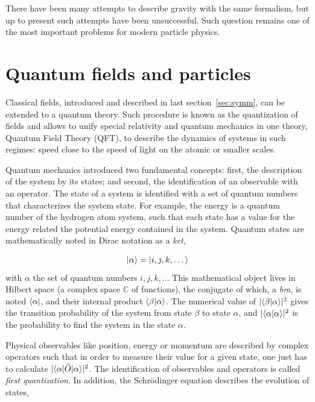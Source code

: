 There have been many attempts to describe gravity with the same formalism, but up to present such attempts have been unsuccessful. Such question remains one of the most important problems for modern particle physics.  

\section{Quantum fields and particles}
\label{sec:fields}

Classical fields, introduced and described in last section~\ref{sec:symm}, can be extended to a quantum theory. Such procedure is known as the quantization of fields and allows to unify special relativity and quantum mechanics in one theory, Quantum Field Theory (QFT), to describe the dynamics of systems in such regimes: speed close to the speed of light on the atomic or smaller scales.

Quantum mechanics introduced two fundamental concepts: first, the description of the system by its states; and second, the identification of an observable with an operator. The state of a system is identified with a set of quantum numbers that characterizes the system state. For example, the energy is a quantum number of the hydrogen atom system, such that each state has a value for the energy related the potential energy contained in the system. Quantum states are mathematically noted in Dirac notation as a \textit{ket},

\begin{equation}
  \label{eq:DiracNot}
  | \alpha\rangle=| i,j,k,\dots\rangle
\end{equation}with $\alpha$ the set of quantum numbers $i,j,k,\dots$ This mathematical object lives in Hilbert space (a complex space $\mathds{C}$ of functions), the conjugate of which, a \textit{bra}, is noted $\langle \alpha |$, and their internal product $\langle \beta | \alpha\rangle$. The numerical value of $|\langle \beta | \alpha\rangle|^{2}$ gives the transition probability of the system from state $\beta$ to state $\alpha$, and $|\langle \alpha | \alpha\rangle|^{2}$ is the probability to find the system in the state $\alpha$.

Physical observables like position, energy or momentum are described by complex operators such that in order to measure their value for a given state, one just has to calculate $|\langle \alpha |\hat{O}| \alpha\rangle|^{2}$. The identification of observables and operators is called \textit{first quantization}. In addition, the Schr\"{o}dinger equation describes the evolution of states,

